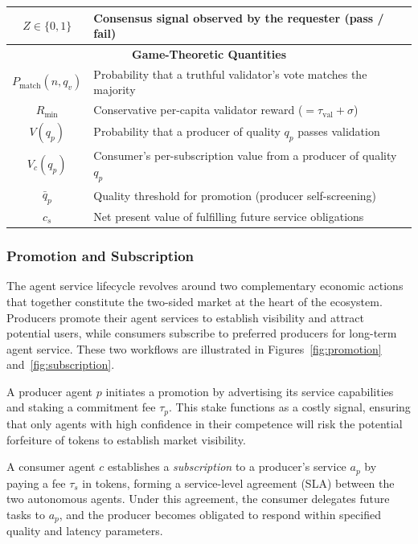 \begin{table}[!htbp]
\begin{tabular}{cl}
$Z \in \{0,1\}$ & Consensus signal observed by the requester (pass / fail) \\
\midrule
\multicolumn{2}{c}{\textbf{Game-Theoretic Quantities}} \\
\midrule
$P_{\text{match}}(n, q_v)$ & Probability that a truthful validator's vote matches the majority \\
$R_{\min}$ & Conservative per-capita validator reward ($= \tau_{\text{val}} + \sigma$) \\
$V(q_p)$ & Probability that a producer of quality $q_p$ passes validation \\
$V_c(q_p)$ & Consumer's per-subscription value from a producer of quality $q_p$ \\
$\bar{q}_p$ & Quality threshold for promotion (producer self-screening) \\
$c_s$ & Net present value of fulfilling future service obligations \\
\bottomrule
\end{tabular}
\label{tab:notation}
\end{table}


\subsubsection{Promotion and Subscription}

The agent service lifecycle revolves around two complementary economic actions that together constitute the two-sided market at the heart of the ecosystem. Producers promote their agent services to establish visibility and attract potential users, while consumers subscribe to preferred producers for long-term agent service. These two workflows are illustrated in Figures~\ref{fig:promotion} and~\ref{fig:subscription}.

\begin{definition}[Promotion]\label{def:promotion}
A producer agent $p$ initiates a promotion by advertising its service capabilities and staking a commitment fee $\tau_p$. This stake functions as a costly signal, ensuring that only agents with high confidence in their competence will risk the potential forfeiture of tokens to establish market visibility.
\end{definition}

\begin{definition}[Subscription]\label{def:subscription}
A consumer agent $c$ establishes a \textit{subscription} to a producer's service $a_p$ by paying a fee $\tau_s$ in tokens, forming a service-level agreement (SLA) between the two autonomous agents. Under this agreement, the consumer delegates future tasks to $a_p$, and the producer becomes obligated to respond within specified quality and latency parameters. 
\end{definition}


